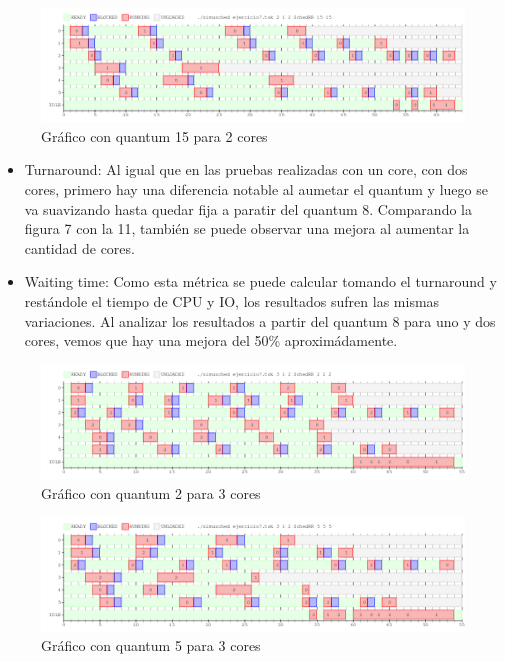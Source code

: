 \documentclass[a4paper,11pt]{article}
\begin{document}
\begin{figure}[H]
\centering
\includegraphics[scale=.6, width=1\textwidth]{graficos/ej7-2core-q4}
\caption{Gráfico con quantum 15 para 2 cores}
\end{figure}

\begin{itemize}
\item Turnaround: Al igual que en las pruebas realizadas con un core, con dos cores, primero hay una diferencia notable al aumetar el quantum y luego se va suavizando hasta quedar fija a paratir del quantum 8. Comparando la figura 7 con la 11, también se puede observar una mejora al aumentar la cantidad de cores.
\item Waiting time: Como esta métrica se puede calcular tomando el turnaround y restándole el tiempo de CPU y IO, los resultados sufren las mismas variaciones. Al analizar los resultados a partir del quantum 8 para uno y dos cores, vemos que hay una mejora del 50\% aproximádamente. 
\end{itemize}

\begin{figure}[H]
\centering
\includegraphics[scale=.6, width=1\textwidth]{graficos/ej7-3core-q1}
\caption{Gráfico con quantum 2 para 3 cores}
\end{figure}

\begin{figure}[H]
\centering
\includegraphics[scale=.6, width=1\textwidth]{graficos/ej7-3core-q2}
\caption{Gráfico con quantum 5 para 3 cores}
\end{figure}
\end{document}

